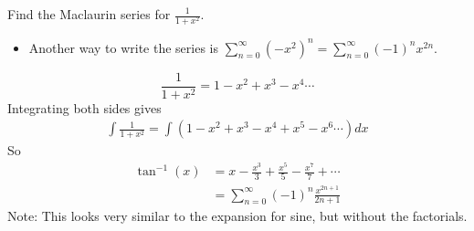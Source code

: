 \begin{frame}
\begin{example} %
Find the Maclaurin series for $\frac{1}{1+x^2}$.
%
%
\begin{itemize}
\item<7->  Another way to write the series is $\sum_{n=0}^\infty (-x^2)^n = \sum_{n=0}^\infty (-1)^nx^{2n}$.
\end{itemize}
\end{example}
\end{frame}


\begin{frame}
\[
\frac{1}{1+x^2} = 1-x^2+x^3-x^4\cdots 
\]
\pause 
Integrating both sides gives \pause 
\begin{align*}
\int \frac{1}{1+x^2} = \int (1-x^2+x^3-x^4+x^5-x^6\cdots)dx 
\end{align*}
\pause  So
\begin{align*}
\tan^{-1}(x) & = x-\frac{x^3}{3}+\frac{x^5}{5}-\frac{x^7}{7}+\cdots\\
& = \sum_{n=0}^\infty (-1)^n\frac{x^{2n+1}}{2n+1} 
\end{align*}
\pause 
Note: This looks very similar to the expansion for sine, but without the factorials.
\end{frame}


